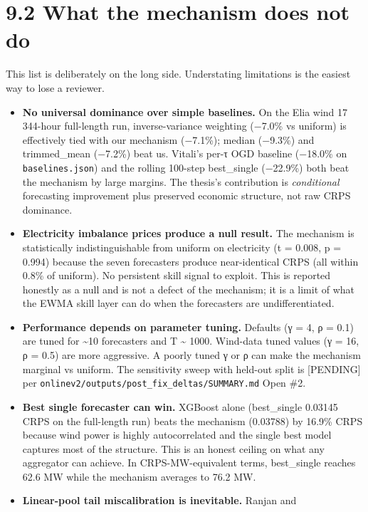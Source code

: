 \documentclass[11pt,a4paper,openany]{report}
\begin{document}
\section{9.2 What the mechanism does not do}

This list is deliberately on the long side. Understating limitations is
the easiest way to lose a reviewer.

\begin{itemize}
  \item \textbf{No universal dominance over simple baselines.} On the Elia wind
    17 344-hour full-length run, inverse-variance weighting (−7.0\% vs
    uniform) is effectively tied with our mechanism (−7.1\%); median
    (−9.3\%) and trimmed\_mean (−7.2\%) beat us. Vitali's per-τ OGD
    baseline (−18.0\% on \texttt{baselines.json}) and the rolling
    100-step best\_single (−22.9\%) both beat the mechanism by large
    margins. The thesis's contribution is \emph{conditional} forecasting
    improvement plus preserved economic structure, not raw CRPS
    dominance.
  \item \textbf{Electricity imbalance prices produce a null result.} The
    mechanism is statistically indistinguishable from uniform on
    electricity (t = 0.008, p = 0.994) because the seven forecasters
    produce near-identical CRPS (all within 0.8\% of uniform). No
    persistent skill signal to exploit. This is reported honestly as a
    null and is not a defect of the mechanism; it is a limit of what
    the EWMA skill layer can do when the forecasters are
    undifferentiated.
  \item \textbf{Performance depends on parameter tuning.} Defaults (γ = 4,
    ρ = 0.1) are tuned for \textasciitilde{}10 forecasters and T \textasciitilde{} 1000. Wind-data
    tuned values (γ = 16, ρ = 0.5) are more aggressive. A poorly tuned
    γ or ρ can make the mechanism marginal vs uniform. The sensitivity
    sweep with held-out split is [PENDING] per
    \texttt{onlinev2/outputs/post\_fix\_deltas/SUMMARY.md} Open \#2.
  \item \textbf{Best single forecaster can win.} XGBoost alone (best\_single
    0.03145 CRPS on the full-length run) beats the mechanism (0.03788)
    by 16.9\% CRPS because wind power is highly autocorrelated and the
    single best model captures most of the structure. This is an honest
    ceiling on what any aggregator can achieve. In CRPS-MW-equivalent
    terms, best\_single reaches 62.6 MW while the mechanism averages to
    76.2 MW.
  \item \textbf{Linear-pool tail miscalibration is inevitable.} Ranjan and

\end{itemize}
\end{document}
